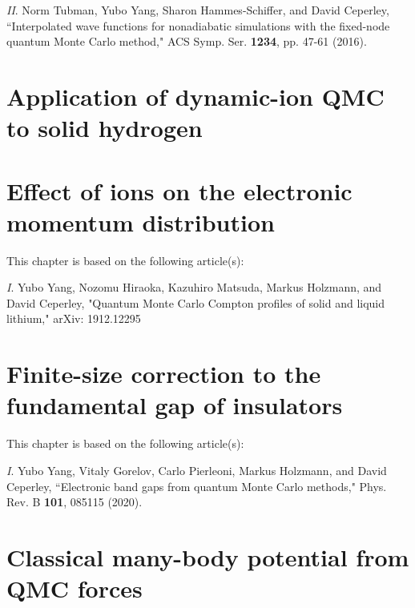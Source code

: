 \documentclass[draftthesis,fullpage]{uiucthesis}
\begin{document}
\textit{II}. Norm Tubman, Yubo Yang, Sharon Hammes-Schiffer, and David Ceperley, ``Interpolated wave functions for nonadiabatic simulations with the fixed-node quantum Monte Carlo method," ACS Symp. Ser. \textbf{1234}, pp. 47-61 (2016).




\chapter{Application of dynamic-ion QMC to solid hydrogen}

\chapter{Effect of ions on the electronic momentum distribution}
This chapter is based on the following article(s):

\textit{I}. Yubo Yang, Nozomu Hiraoka, Kazuhiro Matsuda, Markus Holzmann, and David Ceperley, "Quantum Monte Carlo Compton profiles of solid and liquid lithium," arXiv: 1912.12295




\chapter{Finite-size correction to the fundamental gap of insulators}
This chapter is based on the following article(s):

\textit{I}. Yubo Yang, Vitaly Gorelov, Carlo Pierleoni, Markus Holzmann, and David Ceperley, ``Electronic band gaps from quantum Monte Carlo methods," Phys. Rev. B \textbf{101}, 085115 (2020).



\chapter{Classical many-body potential from QMC forces}
\end{document}
